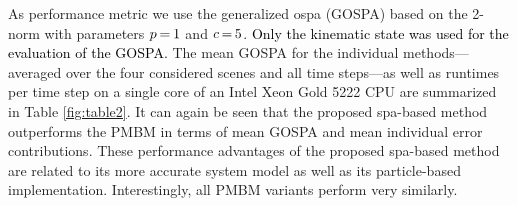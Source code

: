 \documentclass[10pt, twoside, romanappendices]{IEEEtran}
\providecommand{\rd}{\textcolor{black}}
\providecommand{\ist}{\hspace*{.3mm}}
\providecommand{\rmv}{\hspace*{-.3mm}}
\begin{document}
As performance metric we use the generalized \ac{ospa} (GOSPA) \cite{RahGarSve:C17} based on the 2-norm with parameters $p\rmv=\rmv1$ and $c\rmv=\rmv5$. \rd{Only the kinematic state was used for the evaluation of the GOSPA.} The mean GOSPA for the individual methods---averaged over the four considered scenes and all time steps---as well as runtimes per time step on a single core of an Intel Xeon Gold 5222 CPU are summarized in Table \ref{fig:table2}. It can again be seen that the proposed \ac{spa}-based method outperforms the PMBM in terms of mean GOSPA and mean individual error contributions. These performance advantages of the proposed \ac{spa}-based method are related to its more accurate system model as well as its particle-based implementation. Interestingly, all PMBM variants perform very\vspace{0mm} similarly. %
\end{document}
